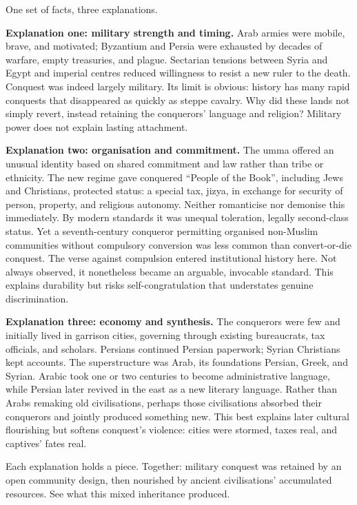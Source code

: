 One set of facts, three explanations.

\textbf{Explanation one: military strength and timing.} Arab armies were mobile, brave, and motivated; Byzantium and Persia were exhausted by decades of warfare, empty treasuries, and plague. Sectarian tensions between Syria and Egypt and imperial centres reduced willingness to resist a new ruler to the death. Conquest was indeed largely military. Its limit is obvious: history has many rapid conquests that disappeared as quickly as steppe cavalry. Why did these lands not simply revert, instead retaining the conquerors' language and religion? Military power does not explain lasting attachment.

\textbf{Explanation two: organisation and commitment.} The umma offered an unusual identity based on shared commitment and law rather than tribe or ethnicity. The new regime gave conquered ``People of the Book'', including Jews and Christians, protected status: a special tax, jizya, in exchange for security of person, property, and religious autonomy. Neither romanticise nor demonise this immediately. By modern standards it was unequal toleration, legally second-class status. Yet a seventh-century conqueror permitting organised non-Muslim communities without compulsory conversion was less common than convert-or-die conquest. The verse against compulsion entered institutional history here. Not always observed, it nonetheless became an arguable, invocable standard. This explains durability but risks self-congratulation that understates genuine discrimination.

\textbf{Explanation three: economy and synthesis.} The conquerors were few and initially lived in garrison cities, governing through existing bureaucrats, tax officials, and scholars. Persians continued Persian paperwork; Syrian Christians kept accounts. The superstructure was Arab, its foundations Persian, Greek, and Syrian. Arabic took one or two centuries to become administrative language, while Persian later revived in the east as a new literary language. Rather than Arabs remaking old civilisations, perhaps those civilisations absorbed their conquerors and jointly produced something new. This best explains later cultural flourishing but softens conquest's violence: cities were stormed, taxes real, and captives' fates real.

Each explanation holds a piece. Together: military conquest was retained by an open community design, then nourished by ancient civilisations' accumulated resources. See what this mixed inheritance produced.

